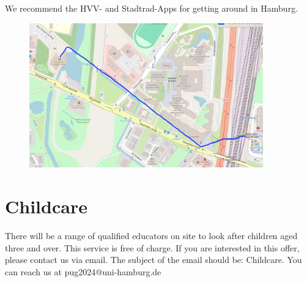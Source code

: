 We recommend the HVV- and Stadtrad-Apps for getting around in Hamburg.

\begin{figure}[H]
	\centering
	\includegraphics[width=0.9\textwidth]{tex/images/infos/venue_path.png}
\end{figure}





\vspace*{1cm}

\section*{Childcare}

There will be a range of qualified educators on site to look after children aged three and over. This service is free of charge. If you are interested in this offer, please contact us via email. The subject of the email should be: Childcare. 
You can reach us at pug2024@uni-hamburg.de

